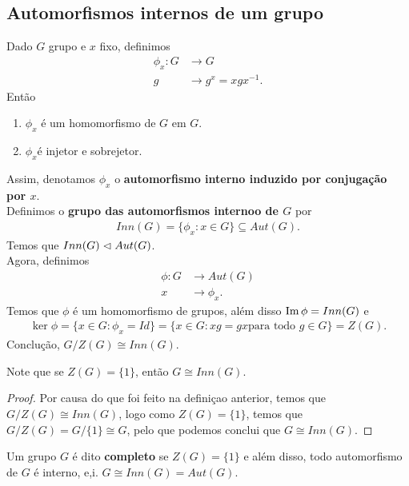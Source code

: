 \subsection{Automorfismos internos de um grupo}
  \begin{definition}
    Dado $G$ grupo e $x$ fixo, definimos
    \begin{align*}
      \phi_x:G&\to G\\
      g&\to g^{x}=xgx^{-1}.
    \end{align*}
    Então
    \begin{enumerate}
      \item $\phi_x$ é um homomorfismo de $G$ em $G$.
      \item $\phi_x$é injetor e sobrejetor.
    \end{enumerate}
    Assim, denotamos $\phi_x$ o \textbf{automorfismo interno induzido por conjugação por $x$}.\\
    Definimos o \textbf{grupo das automorfismos internoo de $G$} por
    \begin{align*}
      Inn(G)=\{\phi_x:x\in G\}\subseteq Aut(G).
    \end{align*}
    Temos que $Inn(G)\vartriangleleft Aut(G)$.\\
    Agora, definimos
    \begin{align*}
      \phi:G&\to Aut(G)\\
      x&\to\phi_x.
    \end{align*}
    Temos que $\phi$ é um homomorfismo de grupos, além disso $\operatorname{Im}\phi=Inn(G)$ e
    \begin{align*}
      \ker\phi=\{x\in G:\phi_x=Id\}=\{x\in G:xg=gx\text{para todo }g\in G\}=Z(G).
    \end{align*}
    Conclução, $G/Z(G)\cong Inn(G)$.
  \end{definition}
  \begin{corollary}\label{cor:1.2.4}
    Note que se $Z(G)=\{1\}$, então $G\cong Inn(G)$.
  \end{corollary}
  \begin{proof} 
    Por causa do que foi feito na definiçao anterior, temos que $G/Z(G)\cong Inn(G)$, logo como $Z(G)=\{1\}$, temos que $G/Z(G)=G/\{1\}\cong G$, pelo que podemos conclui que $G\cong Inn(G)$.
  \end{proof}
  \begin{definition}\label{def:grupo-completo}
    Um grupo $G$ é dito \textbf{completo} se $Z(G)=\{1\}$ e além disso, todo automorfismo de $G$ é interno, e,i. $G\cong Inn(G)=Aut(G)$. 
  \end{definition}
